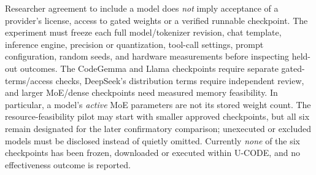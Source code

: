 \documentclass[pdflatex,sn-basic]{sn-jnl}
\begin{document}
Researcher agreement to include a model does \emph{not}
imply acceptance of a provider's license, access to gated
weights or a verified runnable checkpoint. The experiment
must freeze each full model/tokenizer revision, chat template,
inference engine, precision or quantization, tool-call
settings, prompt configuration, random seeds, and hardware
measurements before inspecting held-out outcomes.
The CodeGemma and Llama checkpoints require separate
gated-terms/access checks, DeepSeek's distribution terms
require independent review, and larger MoE/dense checkpoints
need measured memory feasibility. In particular, a model's
\emph{active} MoE parameters are not its stored weight count.
The resource-feasibility pilot may start with smaller
approved checkpoints, but all six remain designated for
the later confirmatory comparison; unexecuted or excluded
models must be disclosed instead of quietly omitted.
Currently \emph{none} of the six checkpoints has been
frozen, downloaded or executed within U-CODE, and no
effectiveness outcome is reported.
\end{document}
